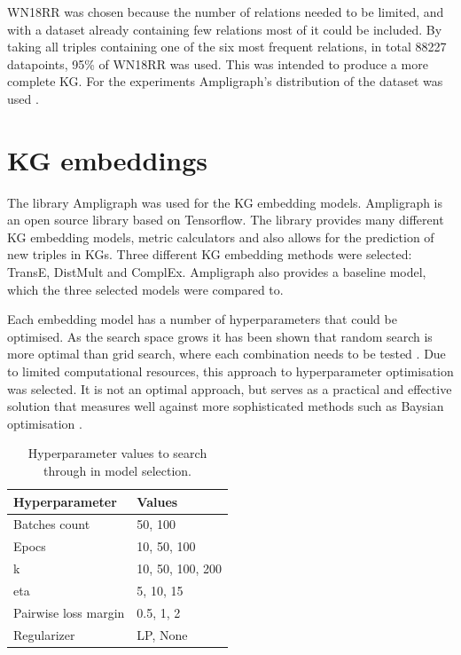 WN18RR was chosen because the number of relations needed to be limited, and with a dataset already containing few relations most of it could be included. By taking all triples containing one of the six most frequent relations, in total 88227 datapoints, 95\% of WN18RR was used. This was intended to produce a more complete KG. For the experiments Ampligraph's distribution of the dataset was used \cite{ampligraph}.

\section{KG embeddings}
The library Ampligraph was used for the KG embedding models. Ampligraph is an open source library based on Tensorflow. The library provides many different KG embedding models, metric calculators and also allows for the prediction of new triples in KGs. Three different KG embedding methods were selected: TransE, DistMult and ComplEx. Ampligraph also provides a baseline model, which the three selected models were compared to. 

Each embedding model has a number of hyperparameters that could be optimised. As the search space grows it has been shown that random search is more optimal than grid search, where each combination needs to be tested \cite{bergstra2012random}. Due to limited computational resources, this approach to hyperparameter optimisation was selected. It is not an optimal approach, but serves as a practical and effective solution that measures well against more sophisticated methods such as Baysian optimisation \cite{li2017hyperband}.

\begin{table}[]
\centering
\begin{tabular}{|l|l|}
\hline
\textbf{Hyperparameter}      & \textbf{Values}             \\ \hline
Batches count       & 50, 100                              \\ \hline
Epocs               & 10, 50, 100                          \\ \hline
k                   & 10, 50, 100, 200                     \\ \hline
eta                 & 5, 10, 15                            \\ \hline
Pairwise loss margin    & 0.5, 1, 2                    \\ \hline
Regularizer         & LP, None                             \\ \hline
\end{tabular}
\caption{Hyperparameter values to search through in model selection.}
\end{table}

